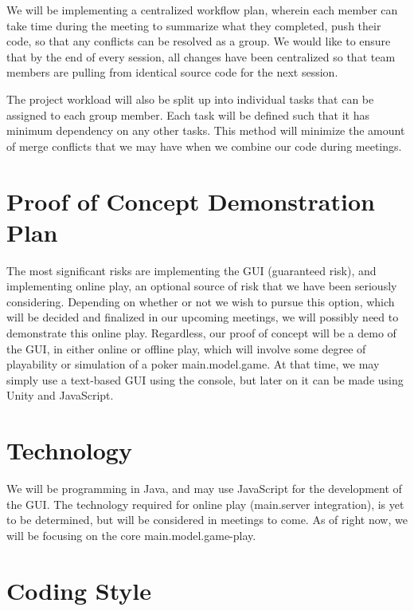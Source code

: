 \documentclass{article}
\begin{document}
We will be implementing a centralized workflow plan, wherein each member can take time during the meeting to summarize what they completed, push their code, so that any conflicts can be resolved as a group. We would like to ensure that by the end of every session, all changes have been centralized so that team members are pulling from identical source code for the next session.

The project workload will also be split up into individual tasks that can be assigned to each group member. Each task will be defined such that it has minimum dependency on any other tasks. This method will minimize the amount of merge conflicts that we may have when we combine our code during meetings. 

\section{Proof of Concept Demonstration Plan}

The most significant risks are implementing the GUI (guaranteed risk), and implementing online play, an optional source of risk that we have been seriously considering. Depending on whether or not we wish to pursue this option, which will be decided and finalized in our upcoming meetings, we will possibly need to demonstrate this online play. Regardless, our proof of concept will be a demo of the GUI, in either online or offline play, which will involve some degree of playability or simulation of a poker main.model.game. At that time, we may simply use a text-based GUI using the console, but later on it can be made using Unity and JavaScript.


\section{Technology}

We will be programming in Java, and may use JavaScript for the development of the GUI. The technology required for online play (main.server integration), is yet to be determined, but will be considered in meetings to come. As of right now, we will be focusing on the core main.model.game-play.


\section{Coding Style}
\end{document}
